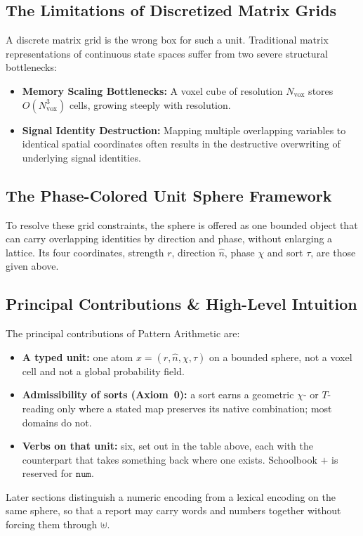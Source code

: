 \documentclass[12pt, a4paper]{article}
\begin{document}
\subsection{The Limitations of Discretized Matrix Grids}
A discrete matrix grid is the wrong box for such a unit. Traditional matrix representations of continuous state spaces suffer from two severe structural bottlenecks:
\begin{itemize}
    \item \textbf{Memory Scaling Bottlenecks:} A voxel cube of resolution $N_{\mathrm{vox}}$ stores $O(N_{\mathrm{vox}}^3)$ cells, growing steeply with resolution.
    \item \textbf{Signal Identity Destruction:} Mapping multiple overlapping variables to identical spatial coordinates often results in the destructive overwriting of underlying signal identities.
\end{itemize}

\subsection{The Phase-Colored Unit Sphere Framework}
To resolve these grid constraints, the sphere is offered as one bounded object that can carry overlapping identities by direction and phase, without enlarging a lattice. Its four coordinates, strength $r$, direction $\hat n$, phase $\chi$ and sort $\tau$, are those given above.

\subsection{Principal Contributions \& High-Level Intuition}
The principal contributions of Pattern Arithmetic are:
\begin{itemize}
    \item \textbf{A typed unit:} one atom $x=(r,\hat n,\chi,\tau)$ on a bounded sphere, not a voxel cell and not a global probability field.
    \item \textbf{Admissibility of sorts (Axiom~0):} a sort earns a geometric $\chi$- or $T$-reading only where a stated map preserves its native combination; most domains do not.
    \item \textbf{Verbs on that unit:} six, set out in the table above, each with the counterpart that takes something back where one exists. Schoolbook $+$ is reserved for $\mathtt{num}$.
\end{itemize}

Later sections distinguish a numeric encoding from a lexical encoding on the same sphere, so that a report may carry words and numbers together without forcing them through $\uplus$.
\end{document}
